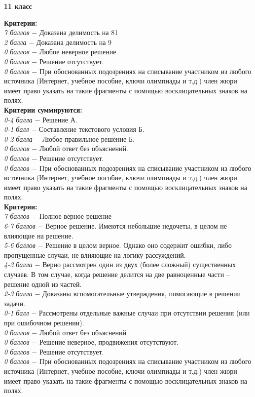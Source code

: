 \centerline{\bf \Huge 11 класс}

 \textbf{Критерии:} \\
\textit{7 баллов} $-$ Доказана делимость на 81\\
\textit{2 балла} $-$ Доказана делимость на 9\\
\textit{0 баллов} $-$ Любое неверное решение.\\
\textit{0 баллов} $-$ Решение отсутствует.\\
\textit{0 баллов} $-$ При обоснованных подозрениях на списывание участником из любого источника (Интернет, учебное пособие, ключи олимпиады и т.д.) член жюри имеет право указать на такие фрагменты с помощью восклицательных знаков на полях. \\
 \textbf{Критерии суммируются:} \\
\textit{0-4 балла} $-$ Решение А.\\
\textit{0-1 балл} $-$ Составление текстового условия Б.\\
\textit{0-2 балла} $-$ Любое правильное решение Б.\\
\textit{0 баллов} $-$ Любой ответ без объяснений.\\
\textit{0 баллов} $-$ Решение отсутствует.\\
\textit{0 баллов} $-$ При обоснованных подозрениях на списывание участником из любого источника (Интернет, учебное пособие, ключи олимпиады и т.д.) член жюри имеет право указать на такие фрагменты с помощью восклицательных знаков на полях. \\


 \textbf{Критерии:} \\
\textit{7 баллов} $-$ Полное верное решение\\
\textit{6-7 баллов} $-$ Верное решение. Имеются небольшие недочеты, в целом не влияющие на решение.\\
\textit{5-6 баллов} $-$ Решение в целом верное. Однако оно содержит ошибки, либо пропущенные случаи, не влияющие на логику рассуждений.\\
\textit{4-3 балла} $-$ Верно рассмотрен один из двух (более сложный) существенных случаев. В том случае, когда решение делится на две равноценные части – решение одной из частей. 
\\
\textit{2-3 балла} $-$ Доказаны вспомогательные утверждения, помогающие в решении задачи.
\\
\textit{0-1 балл} $-$ Рассмотрены отдельные важные случаи при отсутствии решения (или при ошибочном решении).\\
\textit{0 баллов} $-$ Любой ответ без объяснений\\
\textit{0 баллов} $-$ Решение неверное, продвижения отсутствуют.\\
\textit{0 баллов} $-$ Решение отсутствует.\\
\textit{0 баллов} $-$ При обоснованных подозрениях на списывание участником из любого источника (Интернет, учебное пособие, ключи олимпиады и т.д.) член жюри имеет право указать на такие фрагменты с помощью восклицательных знаков на полях. \\


